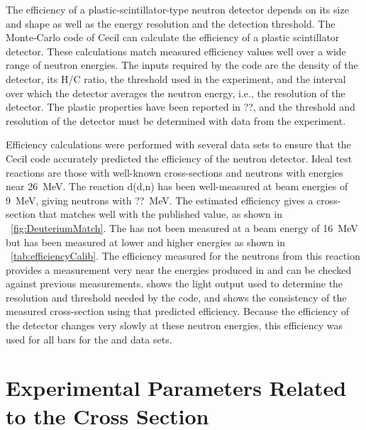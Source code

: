 The efficiency of a plastic-scintillator-type neutron detector depends on its size and shape as well as the energy resolution and the detection threshold.  The Monte-Carlo code of Cecil \cite{Cecil_neutEfficiency} can calculate the efficiency of a plastic scintillator detector.  These calculations match measured efficiency values well over a wide range of neutron energies.  The inputs required by the code are the density of the detector, its H/C ratio, the threshold used in the experiment, and the interval over which the detector averages the neutron energy, i.e., the resolution of the detector.  The plastic properties have been reported in {\tab}??, and the threshold and resolution of the detector must be determined with data from the experiment.  

Efficiency calculations were performed with several data sets to ensure that the Cecil code accurately predicted the efficiency of the neutron detector.  Ideal test reactions are those with well-known cross-sections and neutrons with energies near 26~MeV.  The reaction d(d,n) has been well-measured at beam energies of 9~MeV, giving neutrons with ??~MeV.  The estimated efficiency gives a cross-section that matches well with the published value, as shown in {\fig}~\ref{fig:DeuteriumMatch}.  The \MgReaction has not been measured at a beam energy of 16~MeV but has been measured at lower and higher energies as shown in  {\tab}~\ref{tab:efficiencyCalib}.  The efficiency measured for the neutrons from this reaction provides a measurement very near the energies produced in \reaction and can be checked against previous measurements.  {\fig} shows the light output used to determine the resolution and threshold needed by the code, and {\fig} shows the consistency of the measured cross-section using that predicted efficiency.  Because the efficiency of the detector changes very slowly at these neutron energies, this efficiency was used for all bars for the \MgReaction and \reaction data sets.


\section{Experimental Parameters Related to the Cross Section}


